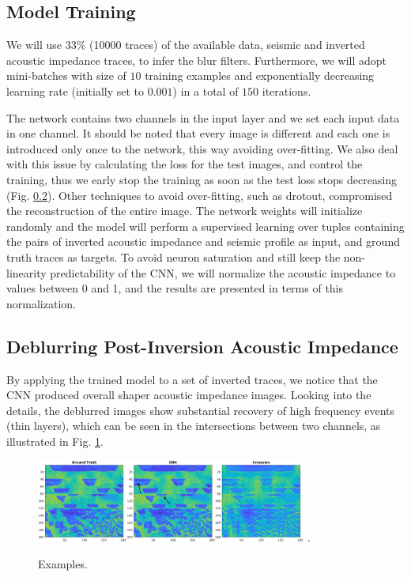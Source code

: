 \documentclass[journal]{IEEEtran}
\begin{document}
\subsection{Model Training}
We will use 33\% (10000 traces)
of the available data, seismic and inverted acoustic impedance traces,
to infer the blur filters. Furthermore, we will adopt 
mini-batches with size of $10$ training examples and exponentially
decreasing learning rate (initially set to $0.001$)
in a total of $150$ iterations.

The network contains two channels in the input layer and we set
each input data in one channel.
It should be noted that every image is different and each
one is introduced only once to the network, this way avoiding
over-fitting. We also deal with this issue by calculating
the loss for the test images, and control the training,
thus we early stop the training as soon as the test loss
stops decreasing (Fig. \ref{}).
Other techniques to avoid over-fitting, such as
drotout, compromised the reconstruction of the entire image.
The network weights
will initialize randomly and the model will perform a supervised
learning over tuples containing the pairs of inverted acoustic
impedance and seismic profile as input, and ground truth traces as targets.
To avoid neuron saturation and still keep the non-linearity predictability
of the CNN, we will normalize the acoustic impedance to values between 0 and 1,
and the results are presented in terms of this normalization.

\subsection{Deblurring Post-Inversion Acoustic Impedance}
By applying the trained model to a set of inverted traces,
we notice that the CNN produced overall shaper acoustic
impedance images. Looking into the details,
the deblurred images show substantial recovery of high frequency events
(thin layers), which can be seen in the intersections between
two channels, as illustrated in Fig. \ref{ImSec26}.
\begin{figure}[!t]
\centering
\includegraphics[width=3.5in]{Figs/ImSec26}
\DeclareGraphicsExtensions.
\caption{Examples.}
\label{ImSec26}
\end{figure}
\end{document}
